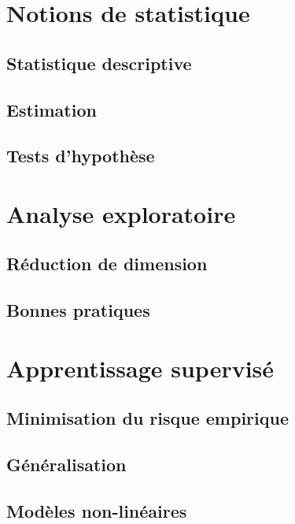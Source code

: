 \documentclass[french,11pt,openany]{book}
\begin{document}
\part{Notions de statistique}
\chapter{Statistique descriptive}

\clearpage 

\chapter{Estimation}

\clearpage

\chapter{Tests d'hypothèse}


\part{Analyse exploratoire}
\vspace{1cm}
\chapter{Réduction de dimension}

\clearpage 

\chapter{Bonnes pratiques}


\part{Apprentissage supervisé}
\chapter{Minimisation du risque empirique}

\clearpage 

\chapter{Généralisation}

\clearpage 

\chapter{Modèles non-linéaires}

\clearpage 
\end{document}
